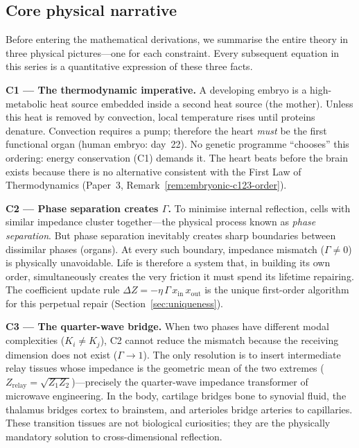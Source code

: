 \documentclass[aps,pre,twocolumn,superscriptaddress,floatfix]{revtex4-2}
\begin{document}
\subsection*{Core physical narrative}

Before entering the mathematical derivations, we
summarise the entire theory in three physical
pictures---one for each constraint.
Every subsequent equation in this series is a
quantitative expression of these three facts.

\textbf{C1 --- The thermodynamic imperative.}
A developing embryo is a high-metabolic heat source
embedded inside a second heat source (the mother).
Unless this heat is removed by convection, local
temperature rises until proteins denature.
Convection requires a pump; therefore the heart
\emph{must} be the first functional organ
(human embryo: day~22).
No genetic programme ``chooses'' this ordering:
energy conservation (C1) demands it.
The heart beats before the brain exists because
there is no alternative consistent with the First
Law of Thermodynamics
(Paper~3, Remark~\ref*{rem:embryonic-c123-order}).

\textbf{C2 --- Phase separation creates $\Gamma$.}
To minimise internal reflection, cells with similar
impedance cluster together---the physical process
known as \emph{phase separation}.
But phase separation inevitably creates sharp
boundaries between dissimilar phases (organs).
At every such boundary, impedance mismatch
($\Gamma \neq 0$) is physically unavoidable.
Life is therefore a system that, in building its
own order, simultaneously creates the very friction
it must spend its lifetime repairing.
The coefficient update rule
$\Delta Z = -\eta\,\Gamma\,x_{\text{in}}\,x_{\text{out}}$
is the unique first-order algorithm for this
perpetual repair (Section~\ref{sec:uniqueness}).

\textbf{C3 --- The quarter-wave bridge.}
When two phases have different modal complexities
($K_i \neq K_j$), C2 cannot reduce the mismatch
because the receiving dimension does not exist
($\Gamma \to 1$).
The only resolution is to insert intermediate
relay tissues whose impedance is the geometric
mean of the two extremes
($Z_{\text{relay}} = \sqrt{Z_1 Z_2}$)---precisely
the quarter-wave impedance transformer of
microwave engineering.
In the body, cartilage bridges bone to synovial
fluid, the thalamus bridges cortex to brainstem,
and arterioles bridge arteries to capillaries.
These transition tissues are not biological
curiosities; they are the physically mandatory
solution to cross-dimensional reflection.
\end{document}
